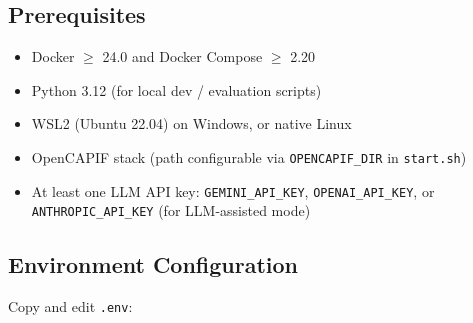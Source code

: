 \documentclass[conference]{IEEEtran}
\begin{document}
\subsection{Prerequisites}

\begin{itemize}[leftmargin=1.2em]
  \item Docker $\geq$ 24.0 and Docker Compose $\geq$ 2.20
  \item Python 3.12 (for local dev / evaluation scripts)
  \item WSL2 (Ubuntu 22.04) on Windows, or native Linux
  \item OpenCAPIF stack (path configurable via \texttt{OPENCAPIF\_DIR} in \texttt{start.sh})
  \item At least one LLM API key: \texttt{GEMINI\_API\_KEY}, \texttt{OPENAI\_API\_KEY},
        or \texttt{ANTHROPIC\_API\_KEY} (for LLM-assisted mode)
\end{itemize}

\subsection{Environment Configuration}

Copy and edit \texttt{.env}:
\end{document}
